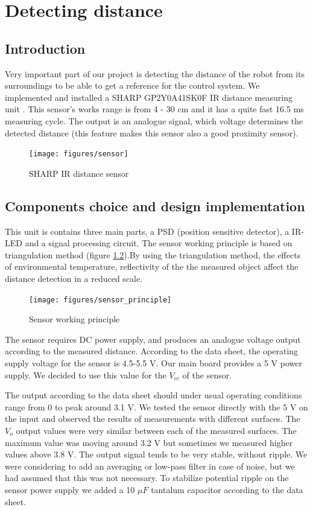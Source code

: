 \chapter{Detecting distance}
\label{chap:Detecting}

\section{Introduction}
Very important part of our project is detecting the distance of the robot from its surroundings to be able to get a reference for the control system. We implemented and installed a SHARP GP2Y0A41SK0F IR distance measuring unit \cite{sensor}. This sensor's works range is from 4 - 30 cm and it has a quite fast 16.5 ms measuring cycle. The output is an analogue signal, which voltage determines the detected distance (this feature makes this sensor also a good proximity sensor). 


\begin{figure}[!ht]
	\centering
	\texttt{[image: figures/sensor]}
	\caption{SHARP IR distance sensor}
	\label{fig:sensor}
\end{figure}
\section{Components choice and design implementation}
This unit is contains three main parts, a PSD (position sensitive detector), a IR-LED and a signal processing circuit. The sensor working principle is based on triangulation method (figure \ref{fig:sensorprinciple}).By using the triangulation method, the effects of environmental temperature, reflectivity of the the measured object affect the distance detection in a reduced scale. 

\begin{figure}[!ht]
	\centering
	\texttt{[image: figures/sensor\_principle]}
	\caption{Sensor working principle}
	\label{fig:sensorprinciple}
\end{figure}

The sensor requires DC power supply, and produces an analogue voltage output according to the measured distance. According to the data sheet, the operating supply voltage for the sensor is 4.5-5.5 V. Our main board provides a 5 V power supply. We decided to use this value for the $V_{cc}$ of the sensor.

The output according to the data sheet should under usual operating conditions range from 0 to peak around 3.1 V. 
We tested the sensor directly with the 5 V on the input and observed the results of measurements with different surfaces. The $V_{o}$ output values were very similar between each of the measured surfaces. The maximum value was moving around 3.2 V but sometimes we measured higher values above 3.8 V. The output signal tends to be very stable, without ripple. We were considering to add an averaging or low-pass filter in case of noise, but we had assumed that this was not necessary. To stabilize potential ripple on the sensor power supply we added a 10 $\mu F$  tantalum capacitor according to the data sheet. 


